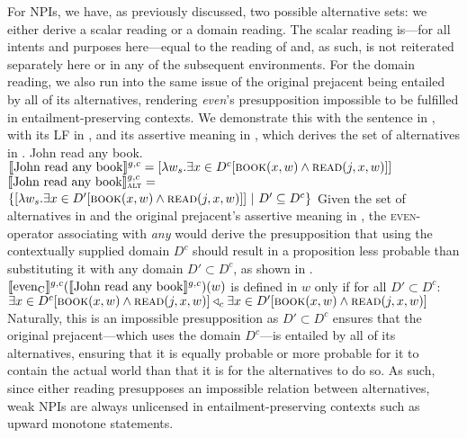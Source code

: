 For NPIs, we have, as previously discussed, two possible alternative sets: we either derive a scalar reading or a domain reading. The scalar reading is---for all intents and purposes here---equal to the reading of  and, as such, is not reiterated separately here or in any of the subsequent environments. For the domain reading, we also run into the same issue of the original prejacent being entailed by all of its alternatives, rendering \textit{even}'s presupposition impossible to be fulfilled in entailment-preserving contexts. We demonstrate this with the sentence in , with its LF in , and its assertive meaning in , which derives the set of alternatives in .
\pex
\a\ljudge{\#} John read any book.
\a[] [even\textsubscript{C} [John read any book]
\a $\intension[g,c]{John read any book}=[\lambda{w_s}.\exists{x\in{D^c}}[\predicate{book}(x,w)\land\predicate{read}(j,x,w)]]$
\a $\intension[g,c]{John read any book}_{\text{\scshape alt}}=$\\\emptyfill$\{[\lambda{w_s}.\exists{x\in{D'}}[\predicate{book}(x,w)\land\predicate{read}(j,x,w)]]~|~D'\subseteq D^c\}$
\xe
Given the set of alternatives in  and the original prejacent's assertive meaning in , the {\scshape even}-operator associating with \textit{any} would derive the presupposition that using the contextually supplied domain $D^c$ should result in a proposition less probable than substituting it with any domain $D'\subset D^c$, as shown in .
\ex
$\intension[g,c]{even\textsubscript{C}}(\intension[g,c]{John read any book})(w)$ is defined in $w$ only if for all $D'\subset D^c$:\\$\exists{x\in D^c}[\predicate{book}(x,w)\land\predicate{read}(j,x,w)]\lprob_c\exists{x\in D'}[\predicate{book}(x,w)\land\predicate{read}(j,x,w)]$
\xe
Naturally, this is an impossible presupposition as $D'\subset D^c$ ensures that the original prejacent---which uses the domain $D^c$---is entailed by all of its alternatives, ensuring that it is equally probable or more probable for it to contain the actual world than that it is for the alternatives to do so. As such, since either reading presupposes an impossible relation between alternatives, weak NPIs are always unlicensed in entailment-preserving contexts such as upward monotone statements.

